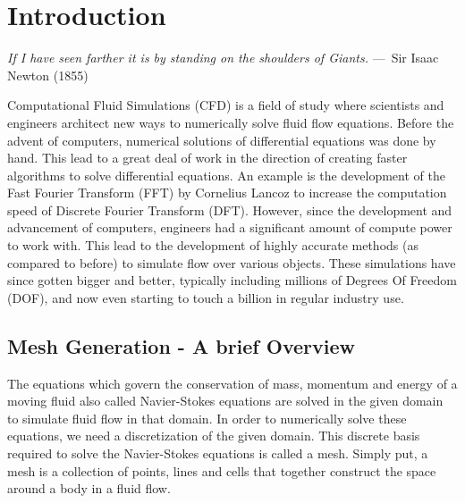 
\chapter{Introduction}
\label{ch:Introduction}

\begin{epigraph}
    \emph{If I have seen farther it is by standing on the shoulders of
    Giants.} ---~Sir Isaac Newton (1855)
\end{epigraph}

Computational Fluid Simulations (CFD) is a field of study where scientists and engineers architect new ways to numerically solve fluid flow equations. Before the advent of computers, numerical solutions of differential equations was done by hand. This lead to a great deal of work in the direction of creating faster algorithms to solve differential equations. An example is the development of the Fast Fourier Transform (FFT) by Cornelius Lancoz to increase the computation speed of Discrete Fourier Transform (DFT). However, since the development and advancement of computers, engineers had a significant amount of compute power to work with. This lead to the development of highly accurate methods (as compared to before) to simulate flow over various objects. These simulations have since gotten bigger and better, typically including millions of Degrees Of Freedom (DOF), and now even starting to touch a billion in regular industry use.

\section{Mesh Generation - A brief Overview}

The equations which govern the conservation of mass, momentum and energy of a moving fluid also called Navier-Stokes equations are solved in the given domain to simulate fluid flow in that domain. In order to numerically solve these equations, we need a discretization of the given domain. This discrete basis required to solve the Navier-Stokes equations is called a mesh. Simply put, a mesh is a collection of points, lines and cells that together construct the space around a body in a fluid flow.

